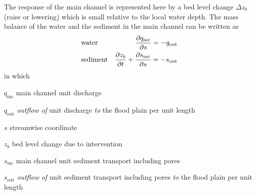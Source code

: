The response of the main channel is represented here by a bed level change $\Delta z_b$  (raise or lowering) which is small relative to the local water depth.
The mass balance of the water and the sediment in the main channel can be written as
%
\begin{align}
&\text{water} & \pdiff{q_\text{mc}}{s} = -q_\text{out} \label{Eq2} \\
&\text{sediment} & \pdiff{z_b}{t} + \pdiff{s_\text{mc}}{s} = -s_\text{out} \label{Eq3}
\end{align}
%
in which
%
\begin{symbollist}
\item[$q_\text{mc}$] main channel unit discharge 
\item[$q_\text{out}$] \emph{outflow of} unit discharge \emph{to} the flood plain per unit length 
\item[$s$] streamwise coordinate 
\item[$z_b$] bed level change due to intervention 
\item[$s_\text{mc}$] main channel unit sediment transport including pores 
\item[$s_\text{out}$] \emph{outflow of} unit sediment transport including pores \emph{to} the flood plain per unit length 
\end{symbollist}

